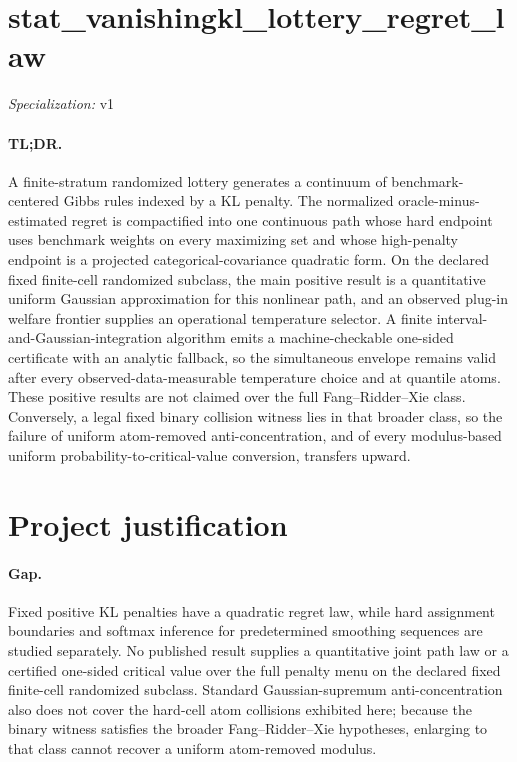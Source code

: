 \documentclass{article}
\begin{document}
\sloppy

\section*{stat\_\allowbreak{}vanishingkl\_\allowbreak{}lottery\_\allowbreak{}regret\_\allowbreak{}law}

\noindent\textit{Specialization:} v1\par

\paragraph{TL;DR.} A finite-stratum randomized lottery generates a continuum of benchmark-centered Gibbs rules indexed by a KL penalty. The normalized oracle-minus-estimated regret is compactified into one continuous path whose hard endpoint uses benchmark weights on every maximizing set and whose high-penalty endpoint is a projected categorical-covariance quadratic form. On the declared fixed finite-cell randomized subclass, the main positive result is a quantitative uniform Gaussian approximation for this nonlinear path, and an observed plug-in welfare frontier supplies an operational temperature selector. A finite interval-and-Gaussian-integration algorithm emits a machine-checkable one-sided certificate with an analytic fallback, so the simultaneous envelope remains valid after every observed-data-measurable temperature choice and at quantile atoms. These positive results are not claimed over the full Fang--Ridder--Xie class. Conversely, a legal fixed binary collision witness lies in that broader class, so the failure of uniform atom-removed anti-concentration, and of every modulus-based uniform probability-to-critical-value conversion, transfers upward.

\section{Project justification}

\paragraph{Gap.} Fixed positive KL penalties have a quadratic regret law, while hard assignment boundaries and softmax inference for predetermined smoothing sequences are studied separately. No published result supplies a quantitative joint path law or a certified one-sided critical value over the full penalty menu on the declared fixed finite-cell randomized subclass. Standard Gaussian-supremum anti-concentration also does not cover the hard-cell atom collisions exhibited here; because the binary witness satisfies the broader Fang--Ridder--Xie hypotheses, enlarging to that class cannot recover a uniform atom-removed modulus.
\end{document}

